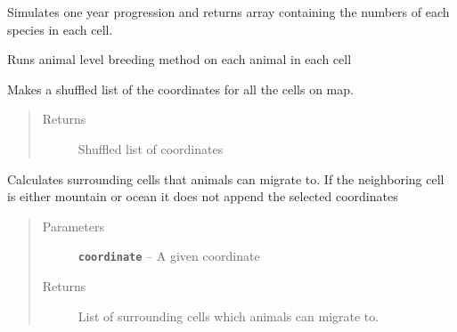 \documentclass[a4paper,10pt,openany,oneside]{sphinxmanual}
\begin{document}
\begin{fulllineitems}
\begin{fulllineitems}
\label{island:biosim.island.Island.one_year}
Simulates one year progression and returns array containing the
numbers of each species in each cell.

\end{fulllineitems}


\begin{fulllineitems}
\label{island:biosim.island.Island.procreation}
Runs animal level breeding method on each animal in each cell

\end{fulllineitems}


\begin{fulllineitems}
\label{island:biosim.island.Island.shuffle_coordinates}
Makes a shuffled list of the coordinates for all the cells on map.
\begin{quote}\begin{description}
\item[{Returns}] \leavevmode
Shuffled list of coordinates

\end{description}\end{quote}

\end{fulllineitems}


\begin{fulllineitems}
\label{island:biosim.island.Island.surrounding_cells}
Calculates surrounding cells that animals can migrate to.
If the neighboring cell is either mountain or ocean it does not
append the selected coordinates
\begin{quote}\begin{description}
\item[{Parameters}] \leavevmode
\textbf{\texttt{coordinate}} -- A given coordinate

\item[{Returns}] \leavevmode
List of surrounding cells which animals can migrate to.


\end{description}
\end{quote}
\end{fulllineitems}
\end{fulllineitems}
\end{document}
